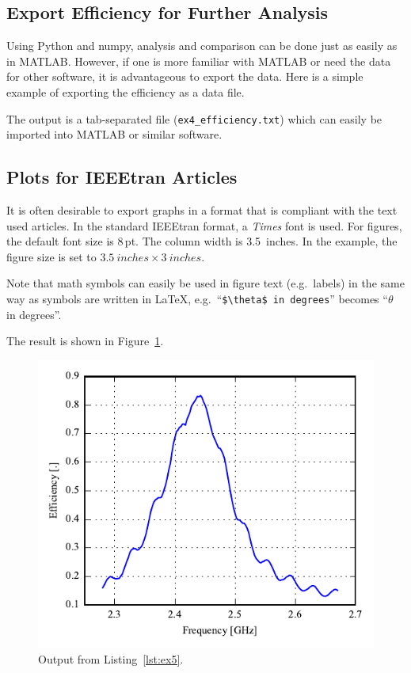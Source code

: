 \subsection{Export Efficiency for Further Analysis}
Using Python and numpy, analysis and comparison can be done just as easily as in MATLAB. However, if one is more familiar with MATLAB or need the data for other software, it is advantageous to export the data. Here is a simple example of exporting the efficiency as a data file.



The output is a tab-separated file (\texttt{ex4\_efficiency.txt}) which can easily be imported into MATLAB or similar software.

\subsection{Plots for IEEEtran Articles}
It is often desirable to export graphs in a format that is compliant with the text used articles. In the standard IEEEtran format, a \emph{Times} font is used. For figures, the default font size is 8\,pt. The column width is \SI{3.5}{inches}. In the example, the figure size is set to $\SI{3.5}{inches}\times \SI{3}{inches}$.

Note that math symbols can easily be used in figure text (e.g.\ labels) in the same way as symbols are written in \LaTeX, e.g.\ ``\verb|$\theta$ in degrees|'' becomes ``$\theta$ in degrees''.

The result is shown in Figure~\ref{fig:pp_example5}.



\begin{figure}[htbp]
    \centering
    \includegraphics{sec/post_processing/examples/ex5_efficiency.pdf}
    \caption{Output from Listing~\ref{lst:ex5}.}
    \label{fig:pp_example5}
\end{figure}

